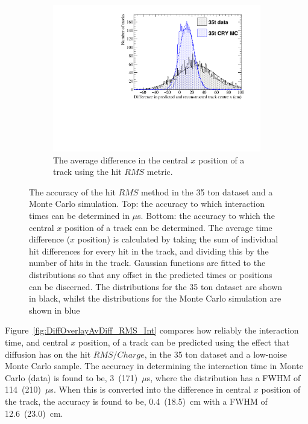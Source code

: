\begin{figure}
  \begin{subfigure}{0.6\textwidth}
    \centering
    \includegraphics[width=\textwidth]{Overlay_AvXPosDiff_RMS}
    \caption{The average difference in the central $x$ position of a track using the hit $RMS$ metric.}
    \label{fig:DiffOverlayAvDiff_RMS_X}
  \end{subfigure}
  \caption[Comparing the accuracy of the hit $RMS$ method in the 35 ton dataset and a Monte Carlo simulation]
          {The accuracy of the hit $RMS$ method in the 35 ton dataset and a Monte Carlo simulation. Top: the accuracy to which interaction times can be determined in $\mu$s. Bottom: the accuracy to which the central $x$ position of a track can be determined. The average time difference ($x$ position) is calculated by taking the sum of individual hit differences for every hit in the track, and dividing this by the number of hits in the track. Gaussian functions are fitted to the distributions so that any offset in the predicted times or positions can be discerned. The distributions for the 35 ton dataset are shown in black, whilst the distributions for the Monte Carlo simulation are shown in blue}
  \label{fig:DiffOverlayAvDiff_RMS}
\end{figure}

Figure~\ref{fig:DiffOverlayAvDiff_RMS_Int} compares how reliably the interaction time, and central $x$ position, of a track can be predicted using the effect that diffusion has on the hit $RMS/Charge$, in the 35 ton dataset and a low-noise Monte Carlo sample. The accuracy in determining the interaction time in Monte Carlo (data) is found to be, 3~(171)~$\mu$s, where the distribution has a FWHM of 114~(210)~$\mu$s. When this is converted into the difference in central $x$ position of the track, the accuracy is found to be, 0.4~(18.5)~cm with a FWHM of 12.6~(23.0)~cm. \\

